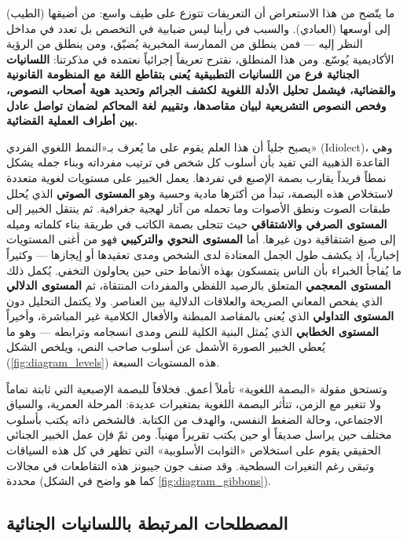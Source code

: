 ما يتّضح من هذا الاستعراض أن التعريفات تتوزع على طيف واسع: من أضيقها (الطيب) إلى أوسعها (العبادي). والسبب في رأينا ليس ضبابية في التخصص بل تعدد في مداخل النظر إليه — فمن ينطلق من الممارسة المخبرية يُضيّق، ومن ينطلق من الرؤية الأكاديمية يُوسّع. ومن هذا المنطلق، نقترح تعريفاً إجرائياً نعتمده في مذكرتنا: \textbf{اللسانيات الجنائية فرع من اللسانيات التطبيقية يُعنى بتقاطع اللغة مع المنظومة القانونية والقضائية، فيشمل تحليل الأدلة اللغوية لكشف الجرائم وتحديد هوية أصحاب النصوص، وفحص النصوص التشريعية لبيان مقاصدها، وتقييم لغة المحاكم لضمان تواصل عادل بين أطراف العملية القضائية.}

يصبح جلياً أن هذا العلم يقوم على ما يُعرف بـ«النمط اللغوي الفردي» (\textenglish{Idiolect})، وهي القاعدة الذهبية التي تفيد بأن أسلوب كل شخص في ترتيب مفرداته وبناء جمله يشكل نمطاً فريداً يقارب بصمة الإصبع في تفردها. يعمل الخبير على مستويات لغوية متعددة لاستخلاص هذه البصمة، تبدأ من أكثرها مادية وحسية وهو \textbf{المستوى الصوتي} الذي يُحلل طبقات الصوت ونطق الأصوات وما تحمله من آثار لهجية جغرافية. ثم ينتقل الخبير إلى \textbf{المستوى الصرفي والاشتقاقي} حيث تتجلى بصمة الكاتب في طريقة بناء كلماته وميله إلى صيغ اشتقاقية دون غيرها. أما \textbf{المستوى النحوي والتركيبي} فهو من أغنى المستويات إخبارياً، إذ يكشف طول الجمل المعتادة لدى الشخص ومدى تعقيدها أو إيجازها — وكثيراً ما يُفاجأ الخبراء بأن الناس يتمسكون بهذه الأنماط حتى حين يحاولون التخفي. يُكمل ذلك \textbf{المستوى المعجمي} المتعلق بالرصيد اللفظي والمفردات المنتقاة، ثم \textbf{المستوى الدلالي} الذي يفحص المعاني الصريحة والعلاقات الدلالية بين العناصر. ولا يكتمل التحليل دون \textbf{المستوى التداولي} الذي يُعنى بالمقاصد المبطنة والأفعال الكلامية غير المباشرة، وأخيراً \textbf{المستوى الخطابي} الذي يُمثل البنية الكلية للنص ومدى انسجامه وترابطه — وهو ما يُعطي الخبير الصورة الأشمل عن أسلوب صاحب النص، ويلخص الشكل (\ref{fig:diagram_levels}) هذه المستويات السبعة.\autocite[18]{kuwait2023}

\diagramLevels

وتستحق مقولة «البصمة اللغوية» تأملاً أعمق. فخلافاً للبصمة الإصبعية التي ثابتة تماماً ولا تتغير مع الزمن، تتأثر البصمة اللغوية بمتغيرات عديدة: المرحلة العمرية، والسياق الاجتماعي، وحالة الضغط النفسي، والهدف من الكتابة. فالشخص ذاته يكتب بأسلوب مختلف حين يراسل صديقاً أو حين يكتب تقريراً مهنياً. ومن ثمّ فإن عمل الخبير الجنائي الحقيقي يقوم على استخلاص «الثوابت الأسلوبية» التي تظهر في كل هذه السياقات وتبقى رغم التغيرات السطحية. وقد صنف جون جيبونز هذه التقاطعات في مجالات محددة (كما هو واضح في الشكل \ref{fig:diagram_gibbons}).

\diagramGibbons

\subsection{المصطلحات المرتبطة باللسانيات الجنائية}


